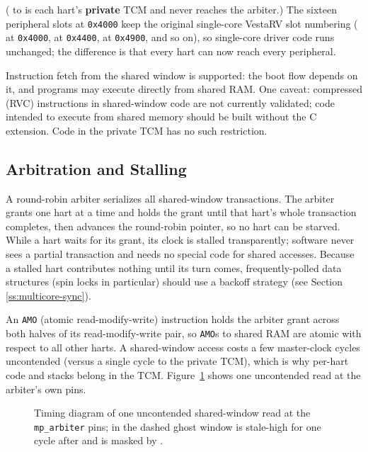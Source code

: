 (\texttt{\RamStartAddress} to \texttt{\RamEndAddress} is each hart's \textbf{private} TCM and never reaches the arbiter.) The sixteen peripheral slots at \texttt{0x4000} keep the original single-core VestaRV slot numbering ( at \texttt{0x4000},  at \texttt{0x4400},  at \texttt{0x4900}, and so on), so single-core driver code runs unchanged; the difference is that every hart can now reach every peripheral.

Instruction fetch from the shared window is supported: the boot flow depends on it, and programs may execute directly from shared RAM. One caveat: compressed (RVC) instructions in shared-window code are not currently validated; code intended to execute from shared memory should be built without the C extension. Code in the private TCM has no such restriction.

\subsection{Arbitration and Stalling}

A round-robin arbiter serializes all shared-window transactions. The arbiter grants one hart at a time and holds the grant until that hart's whole transaction completes, then advances the round-robin pointer, so no hart can be starved. While a hart waits for its grant, its clock is stalled transparently; software never sees a partial transaction and needs no special code for shared accesses. Because a stalled hart contributes nothing until its turn comes, frequently-polled data structures (spin locks in particular) should use a backoff strategy (see Section \ref{ss:multicore-sync}).

An \texttt{AMO} (atomic read-modify-write) instruction holds the arbiter grant across both halves of its read-modify-write pair, so \texttt{AMO}s to shared RAM are atomic with respect to all other harts. A shared-window access costs a few master-clock cycles uncontended (versus a single cycle to the private TCM), which is why per-hart code and stacks belong in the TCM. Figure~\ref{fig:arbiter-handshake} shows one uncontended read at the arbiter's own pins.

\begin{figure}[htpb]
	\centering
	
	\caption[{Timing diagram of one uncontended shared-window read at the \texttt{mp\_arbiter} pins.}]{Timing diagram of one uncontended shared-window read at the \texttt{mp\_arbiter} pins; in the dashed ghost window  is stale-high for one cycle after  and is masked by .}
	\label{fig:arbiter-handshake}
\end{figure}

